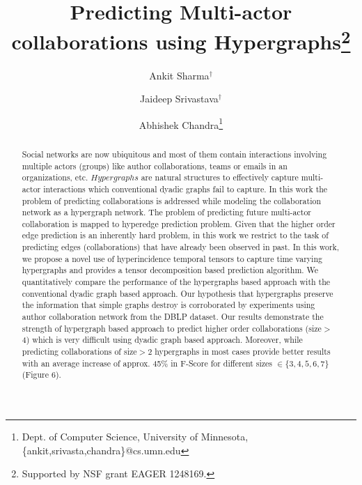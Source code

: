 \documentclass[twoside,leqno,twocolumn]{article}
\begin{document}

\title{\Large Predicting Multi-actor collaborations using Hypergraphs\thanks{Supported by NSF grant EAGER 1248169.}}
\author{
Ankit Sharma$^{\dag}$
\and 
Jaideep Srivastava$^{\dag}$
\and 
Abhishek Chandra\thanks{Dept. of Computer Science, University of Minnesota, \{ankit,srivasta,chandra\}@cs.umn.edu}}

\maketitle

 

\begin{abstract} \small\baselineskip=9pt 

Social networks are now ubiquitous and most of them contain interactions involving multiple actors (groups) like author collaborations, teams or emails in an organizations, etc. \(Hypergraphs\) are natural structures to effectively capture multi-actor interactions which conventional dyadic graphs fail to capture. In this work the problem of predicting collaborations is addressed while modeling the collaboration network as a hypergraph network. The problem of predicting future multi-actor collaboration is mapped to hyperedge prediction problem. Given that the higher order edge prediction is an inherently hard problem, in this work we restrict to the task of predicting edges (collaborations) that have already been observed in past. In this work, we propose a novel use of hyperincidence temporal tensors to capture time varying hypergraphs and provides a tensor decomposition based prediction algorithm. We quantitatively compare the performance of the hypergraphs based approach with the conventional dyadic graph based approach. Our hypothesis that hypergraphs preserve the information that simple graphs destroy is corroborated by experiments using author collaboration network from the DBLP dataset. Our results demonstrate the strength of hypergraph based approach to predict higher order collaborations (size$>$4) which is very difficult using dyadic graph based approach. Moreover, while predicting collaborations of size$>$2 hypergraphs in most cases provide better results with an average increase of approx. 45\% in F-Score for different sizes $\in \{3,4,5,6,7\}$ (Figure 6). 

\end{abstract}
\end{document}
